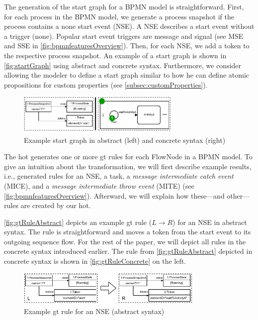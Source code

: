 \documentclass[runningheads]{llncs}
\begin{document}
The generation of the start graph for a BPMN model is straightforward.
First, for each process in the BPMN model, we generate a process snapshot if the process contains a none start event (NSE).
A NSE describes a start event without a trigger (none).
Popular start event triggers are message and signal (see MSE and SSE in \autoref{fig:bpmnfeaturesOverview}).
Then, for each NSE, we add a token to the respective process snapshot.
An example of a start graph is shown in \autoref{fig:startGraph} using abstract and concrete syntax.
Furthermore, we consider allowing the modeler to define a start graph similar to how he can define atomic propositions for custom properties (see \autoref{subsec:customProperties}).

\begin{figure}[ht]
    \centering
    \includegraphics[width=0.7\textwidth]{images/startGraph.pdf}
    \caption{Example start graph in abstract (left) and concrete syntax (right)}
    \label{fig:startGraph}
\end{figure}

The \gls*{hot} generates one or more \gls*{gt} rules for each \textsf{FlowNode} in a BPMN model.
To give an intuition about the transformation, we will first describe example results, i.e., generated rules for an NSE, a task, a \textit{message intermediate catch event} (MICE), and a \textit{message intermediate throw event} (MITE) (see \autoref{fig:bpmnfeaturesOverview}).
Afterward, we will explain how these---and other---rules are created by our \gls*{hot}.

\autoref{fig:gtRuleAbstract} depicts an example \gls*{gt} rule ($L \to R$) for an NSE in abstract syntax.
The rule is straightforward and moves a token from the start event to its outgoing sequence flow.
For the rest of the paper, we will depict all rules in the concrete syntax introduced earlier.
The rule from \autoref{fig:gtRuleAbstract} depicted in concrete syntax is shown in \autoref{fig:gtRuleConcrete} on the left.

\begin{figure}[ht]
    \centering
  \includegraphics[width=0.8\textwidth]{images/rule_abstract.pdf}
  \caption{Example \gls*{gt} rule for an NSE (abstract syntax)}  \label{fig:gtRuleAbstract}
\end{figure}
\end{document}
